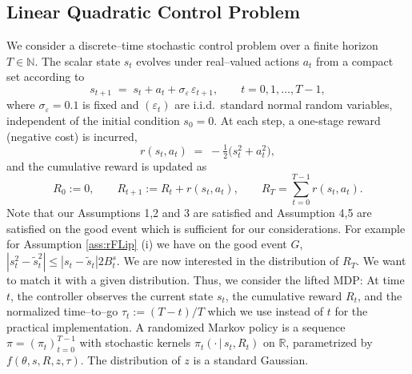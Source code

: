 \documentclass[reqno, 11pt]{amsart}%
\theoremstyle{definition}
\begin{document}
\subsection{Linear Quadratic Control Problem}
We consider a discrete--time stochastic control problem over a finite horizon \(T\in\mathbb{N}\).
The scalar state \(s_t\) evolves under real--valued actions \(a_t\) from a compact set according to
\begin{equation}\label{eq:dynamics}
  s_{t+1} \;=\; s_t + a_t + \sigma_\varepsilon\,\varepsilon_{t+1}, 
  \qquad t=0,1,\dots,T-1,
\end{equation}
where \(\sigma_\varepsilon=0.1\) is fixed and \((\varepsilon_t)\) are i.i.d.\  standard normal random variables, independent of the initial condition \(s_0=0\).  At each step, a one-stage reward (negative cost) is incurred,
\begin{equation}\label{eq:stage-cost}
  r(s_t,a_t) \;=\; -\tfrac12\bigl(s_t^2 + a_t^2\bigr),
\end{equation}
and the cumulative reward is updated as
\begin{equation}\label{eq:cumulative-cost}
  R_0 := 0,
  \qquad 
  R_{t+1} := R_t + r(s_t,a_t),
  \qquad 
  R_T = \sum_{t=0}^{T-1} r(s_t,a_t) .
\end{equation}
Note that our Assumptions 1,2 and 3 are satisfied and Assumption 4,5 are satisfied on the good event which is sufficient for our considerations. For example for Assumption \ref{ass:rFLip} (i) we have on the good event $G$, $|s_t^2-\tilde s_t^2|\le |s_t-\tilde s_t| 2 B^s_t$.
We are now interested in the distribution of $R_T$. We want to match it with a given distribution. Thus, we consider the lifted MDP:
At time \(t\), the controller observes the current state \(s_t\), the cumulative reward \(R_t\), and the normalized time--to--go
\(\tau_t := (T-t)/T\) which we use instead of $t$ for the practical implementation.
A  randomized Markov policy is a sequence \(\pi=(\pi_t)_{t=0}^{T-1}\) with stochastic kernels
\(\pi_t(\cdot\,|\,s_t,R_t)\) on \(\mathbb{R}\), parametrized by $f(\theta,s,R,z,\tau)$. The distribution of $z$ is a standard Gaussian. 
\end{document}
